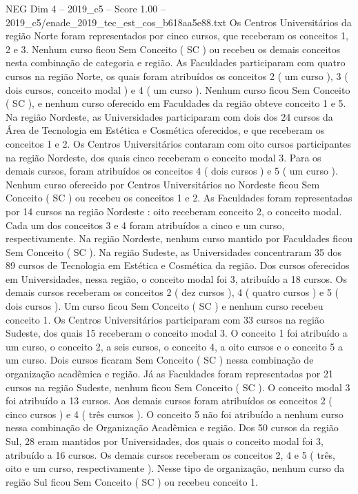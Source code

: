 \begin{textsample}{NEG Dim 4 – 2019\_c5 – Score 1.00 – 2019\_c5/enade\_2019\_tec\_est\_cos\_b618aa5e88.txt}
Os Centros Universitários da região Norte foram representados por cinco cursos, que receberam os conceitos 1, 2 e 3.
Nenhum curso ficou Sem Conceito ( SC ) ou recebeu os demais conceitos nesta combinação de categoria e região.
As Faculdades participaram com quatro cursos na região Norte, os quais foram atribuídos os conceitos 2 ( um curso ), 3 ( dois cursos, conceito modal ) e 4 ( um curso ).
Nenhum curso ficou Sem Conceito ( SC ), e nenhum curso oferecido em Faculdades da região obteve conceito 1 e 5.
Na região Nordeste, as Universidades participaram com dois dos 24 cursos da Área de Tecnologia em Estética e Cosmética oferecidos, e que receberam os conceitos 1 e 2.
Os Centros Universitários contaram com oito cursos participantes na região Nordeste, dos quais cinco receberam o conceito modal 3.
Para os demais cursos, foram atribuídos os conceitos 4 ( dois cursos ) e 5 ( um curso ).
Nenhum curso oferecido por Centros Universitários no Nordeste ficou Sem Conceito ( SC ) ou recebeu os conceitos 1 e 2.
As Faculdades foram representadas por 14 cursos na região Nordeste : oito receberam conceito 2, o conceito modal.
Cada um dos conceitos 3 e 4 foram atribuídos a cinco e um curso, respectivamente.
Na região Nordeste, nenhum curso mantido por Faculdades ficou Sem Conceito ( SC ).
Na região Sudeste, as Universidades concentraram 35 dos 89 cursos de Tecnologia em Estética e Cosmética da região.
Dos cursos oferecidos em Universidades, nessa região, o conceito modal foi 3, atribuído a 18 cursos.
Os demais cursos receberam os conceitos 2 ( dez cursos ), 4 ( quatro cursos ) e 5 ( dois cursos ).
Um curso ficou Sem Conceito ( SC ) e nenhum curso recebeu conceito 1.
Os Centros Universitários participaram com 33 cursos na região Sudeste, dos quais 15 receberam o conceito modal 3.
O conceito 1 foi atribuído a um curso, o conceito 2, a seis cursos, o conceito 4, a oito cursos e o conceito 5 a um curso.
Dois cursos ficaram Sem Conceito ( SC ) nessa combinação de organização acadêmica e região.
Já as Faculdades foram representadas por 21 cursos na região Sudeste, nenhum ficou Sem Conceito ( SC ).
O conceito modal 3 foi atribuído a 13 cursos.
Aos demais cursos foram atribuídos os conceitos 2 ( cinco cursos ) e 4 ( três cursos ).
O conceito 5 não foi atribuído a nenhum curso nessa combinação de Organização Acadêmica e região.
Dos 50 cursos da região Sul, 28 eram mantidos por Universidades, dos quais o conceito modal foi 3, atribuído a 16 cursos.
Os demais cursos receberam os conceitos 2, 4 e 5 ( três, oito e um curso, respectivamente ).
Nesse tipo de organização, nenhum curso da região Sul ficou Sem Conceito ( SC ) ou recebeu conceito 1.

\end{textsample}
